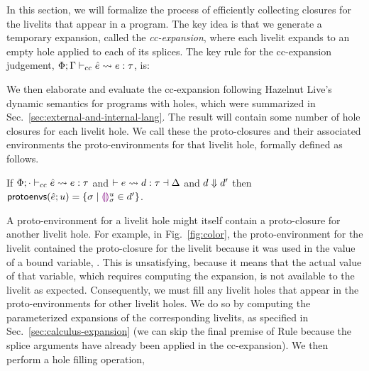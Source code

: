 In this section, we will formalize the process of efficiently collecting closures 
for the livelits that appear in a program. The key idea is that we generate a temporary expansion,
called the \emph{cc-expansion}, 
where each livelit expands to an empty hole applied to each of its splices. 
The key rule for the cc-expansion judgement, $\ccexpands{\Phi}{\Gamma}{\hat e}{e}{\tau}$, is:
\begin{mathpar}
\end{mathpar}
We then elaborate and evaluate the cc-expansion 
following Hazelnut Live's dynamic semantics for programs with holes, which were summarized 
in Sec.~\ref{sec:external-and-internal-lang}. The result will contain some number of hole closures
for each livelit hole. We call these the proto-closures and their associated environments the proto-environments for that livelit hole, formally defined as follows.
\begin{definition}
If $\ccexpands{\Phi}{\cdot}{\hat e}{e}{\tau}$ and $\elabs{}{e}{d}{\tau}{\Delta}$
and $\evalsTo{d}{d'}$ then $\protoEnvsOf{\hat e}{u} = \{ \sigma \mid \dehole{u}{\sigma} \in d' \}$.
\end{definition}
A proto-environment for a livelit hole might itself contain a proto-closure for another livelit hole.
For example, in Fig.~\ref{fig:color}, the proto-environment for the  livelit contained the 
proto-closure for the  livelit because it was used in the value of a bound variable, .
This is unsatisfying, because it means that the actual value of that variable, which requires computing the expansion,
 is not available to the 
livelit as expected.
Consequently, we must fill any livelit holes that appear in the proto-environments for other livelit holes.
We do so by computing the parameterized expansions of the corresponding livelits,  
as specified in Sec.~\ref{sec:calculus-expansion} (we can skip the final premise of Rule  because the 
splice arguments have already been applied in the cc-expansion). We then perform a hole filling operation, 
